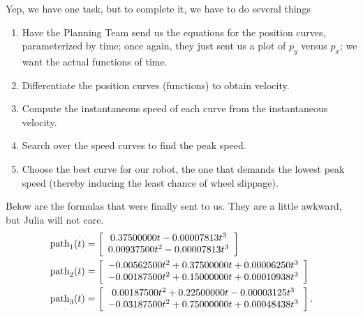 Yep, we have one task, but to complete it, we have to do several things
\begin{enumerate}
\renewcommand{\labelenumi}{(\alph{enumi})}
\setlength{\itemsep}{.2cm}
    \item Have the Planning Team send us the equations for the position curves, parameterized by time; once again, they just sent us a plot of $p_{y}$ versus $p_{x}$; we want the actual functions of time.  
    \item Differentiate the position curves (functions) to obtain velocity. 
    \item Compute the instantaneous speed of each curve from the instantaneous velocity.
    \item Search over the speed curves to find the peak speed.
    \item Choose the best curve for our robot, the one that demands the lowest peak speed (thereby inducing the least chance of wheel slippage). 
\end{enumerate}

\vspace*{.2cm}

Below are the formulas that were finally sent to us. They are a little awkward, but Julia will not care. 
\begin{equation}
\label{eq:PositionTrajectories}
\begin{aligned}
   {\rm path}_1(t) &= \left[
\begin{array}{c}
0.37500000 t - 0.00007813 t^3 \\
0.00937500 t^2 - 0.00007813 t^3 \\
\end{array}
\right]\\
{\rm path}_2(t) &=  \left[
\begin{array}{c}
 - 0.00562500 t^2 + 0.37500000 t + 0.00006250 t^3 \\
 - 0.00187500 t^2 + 0.15000000 t + 0.00010938 t^3 \\
\end{array}
\right]\\
%
%
{\rm path}_3(t)&= \left[
\begin{array}{c}
0.00187500 t^2 + 0.22500000 t - 0.00003125 t^3 \\
 - 0.03187500 t^2 + 0.75000000 t + 0.00048438 t^3 \\
\end{array}
\right].
\end{aligned}
\end{equation}

